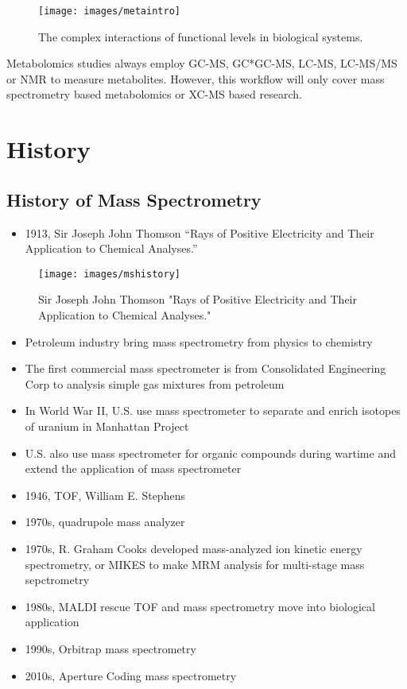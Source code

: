\documentclass[
]{book}
\providecommand{\tightlist}{%
  \setlength{\itemsep}{0pt}\setlength{\parskip}{0pt}}
\begin{document}
\begin{figure}
\texttt{[image: images/metaintro]} \caption{The complex interactions of functional levels in biological systems.}\label{fig:metaintro}
\end{figure}

Metabolomics studies always employ GC-MS\citep{theodoridis2012}, GC*GC-MS\citep{tian2016}, LC-MS\citep{gika2014}, LC-MS/MS\citep{begou2017} or NMR\citep{zhang2012a, b.dunn2011} to measure metabolites. However, this workflow will only cover mass spectrometry based metabolomics or XC-MS based research.

\hypertarget{history}{%
\section{History}\label{history}}

\hypertarget{history-of-mass-spectrometry}{%
\subsection{History of Mass Spectrometry}\label{history-of-mass-spectrometry}}

\begin{itemize}
\tightlist
\item
  1913, Sir Joseph John Thomson ``Rays of Positive Electricity and Their Application to Chemical Analyses.''
\end{itemize}

\begin{figure}
\texttt{[image: images/mshistory]} \caption{Sir Joseph John Thomson "Rays of Positive Electricity and Their Application to Chemical Analyses."}\label{fig:history}
\end{figure}

\begin{itemize}
\item
  Petroleum industry bring mass spectrometry from physics to chemistry
\item
  The first commercial mass spectrometer is from Consolidated Engineering Corp to analysis simple gas mixtures from petroleum
\item
  In World War II, U.S. use mass spectrometer to separate and enrich isotopes of uranium in Manhattan Project
\item
  U.S. also use mass spectrometer for organic compounds during wartime and extend the application of mass spectrometer
\item
  1946, TOF, William E. Stephens
\item
  1970s, quadrupole mass analyzer
\item
  1970s, R. Graham Cooks developed mass-analyzed ion kinetic energy spectrometry, or MIKES to make MRM analysis for multi-stage mass sepctrometry
\item
  1980s, MALDI rescue TOF and mass spectrometry move into biological application
\item
  1990s, Orbitrap mass spectrometry
\item
  2010s, Aperture Coding mass spectrometry
\end{itemize}
\end{document}
